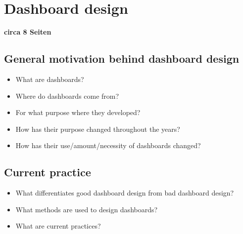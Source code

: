 \chapter{Dashboard design}
\textbf{circa 8 Seiten}

\section{General motivation behind dashboard design} \label{sec:DashboardGeneral}
\begin{itemize}
    \item What are dashboards?
    \item Where do dashboards come from?
    \item For what purpose where they developed?
    \item How has their purpose changed throughout the years?
    \item How has their use/amount/necessity of dashboards changed?
\end{itemize}
\section{Current practice} \label{sec:Dashboard_CurrentPractice}
\begin{itemize}
    \item What differentiates good dashboard design from bad dashboard design?
    \item What methods are used to design dashboards?
    \item What are current practices?
\end{itemize}


